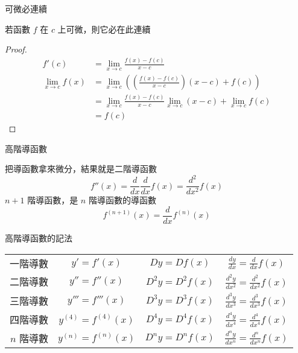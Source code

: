 \documentclass{beamer}
\begin{document}
\begin{CJK}{UTF8}{bsmi}
\begin{frame}{可微必連續}
  \begin{theorem}
    若函數 $f$ 在 $c$ 上可微，則它必在此連續
  \end{theorem}
  \begin{proof}
    \begin{align*}
      f'(c) &= \lim_{x \to c} \frac{f(x) - f(c)}{x-c}\\
      \lim_{x \to c} f(x) &= \lim_{x \to c} \left( \left( \frac{f(x) - f(c)}{x-c} \right) (x-c) + f(c) \right)\\
	&= \lim_{x \to c} \frac{f(x) - f(c)}{x-c} \lim_{x \to c} (x-c) + \lim_{x \to c} f(c)\\
	&= f(c)
    \end{align*}
  \end{proof}
\end{frame}

\begin{frame}{高階導函數}
  \begin{definition}
    把導函數拿來微分，結果就是二階導函數
    \[f''(x) = \frac{d}{dx} \frac{d}{dx} f(x) = \frac{d^2}{dx^2} f(x)\]
    $n+1$ 階導函數，是 $n$ 階導函數的導函數
    \[f^{(n+1)}(x) = \frac{d}{dx} f^{(n)}(x)\]
  \end{definition}
\end{frame}

\begin{frame}{高階導函數的記法}
  \begin{center}
    \renewcommand\arraystretch{2.5}
    \begin{tabular}{rccc}
      一階導數  &$y'=f'(x)$          & $Dy=Df(x)$    & $\displaystyle\frac{dy}{dx}=\frac{d}{dx}f(x)$\\
      二階導數  &$y''=f''(x)$        & $D^2y=D^2f(x)$& $\displaystyle\frac{d^2y}{dx^2}=\frac{d^2}{dx^2}f(x)$\\
      三階導數  &$y'''=f'''(x)$      & $D^3y=D^3f(x)$& $\displaystyle\frac{d^3y}{dx^3}=\frac{d^3}{dx^3}f(x)$\\
      四階導數  &$y^{(4)}=f^{(4)}(x)$& $D^4y=D^4f(x)$& $\displaystyle\frac{d^4y}{dx^4}=\frac{d^4}{dx^4}f(x)$\\
      $n$ 階導數&$y^{(n)}=f^{(n)}(x)$& $D^ny=D^nf(x)$& $\displaystyle\frac{d^ny}{dx^n}=\frac{d^n}{dx^n}f(x)$
    \end{tabular}
  \end{center}
\end{frame}


\end{CJK}
\end{document}
